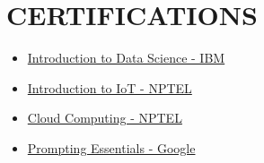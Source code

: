 \documentclass[]{deedy-resume-openfont}
\begin{document}
\begin{minipage}[t]{0.66\textwidth}
 \section{CERTIFICATIONS} 
 \begin{itemize}
  \normalsize
  \item \href{https://coursera.org/share/40e583460d69228aa1cf1cc638a7b262}{Introduction to Data Science - IBM}
  \item \href{https://github.com/BVPKARTHIKEYA/CERTIFICATIONS/blob/main/Introduction%20To%20Internet%20Of%20Things.pdf}{Introduction to IoT - NPTEL}
  \item \href{https://github.com/BVPKARTHIKEYA/CERTIFICATIONS/blob/main/Cloud%20Computing.pdf}{Cloud Computing - NPTEL}
  \item \href{https://coursera.org/share/28117bcf33227e40b537b30519f6a162}{Prompting Essentials - Google}
\end{itemize}

     










\end{minipage} 
\end{document}
